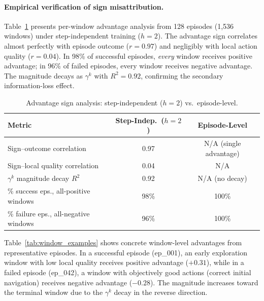 \documentclass[10pt]{article}
\begin{document}
\paragraph{Empirical verification of sign misattribution.}
Table~\ref{tab:sign} presents per-window advantage analysis from 128 episodes (1,536 windows) under step-independent training ($h{=}2$). The advantage sign correlates almost perfectly with episode outcome ($r = 0.97$) and negligibly with local action quality ($r = 0.04$). In 98\% of successful episodes, \emph{every} window receives positive advantage; in 96\% of failed episodes, every window receives negative advantage. The magnitude decays as $\gamma^k$ with $R^2 = 0.92$, confirming the secondary information-loss effect.

\begin{table}[h]
\centering
\caption{Advantage sign analysis: step-independent ($h{=}2$) vs.\ episode-level.}
\label{tab:sign}
\begin{tabular}{lcc}
\toprule
Metric & Step-Indep.\ ($h{=}2$) & Episode-Level \\
\midrule
Sign--outcome correlation & 0.97 & N/A (single advantage) \\
Sign--local quality correlation & 0.04 & N/A \\
$\gamma^k$ magnitude decay $R^2$ & 0.92 & N/A (no decay) \\
\% success eps., all-positive windows & 98\% & 100\% \\
\% failure eps., all-negative windows & 96\% & 100\% \\
\bottomrule
\end{tabular}
\end{table}

Table~\ref{tab:window_examples} shows concrete window-level advantages from representative episodes. In a successful episode (ep\_001), an early exploration window with low local quality receives positive advantage ($+0.31$), while in a failed episode (ep\_042), a window with objectively good actions (correct initial navigation) receives negative advantage ($-0.28$). The magnitude increases toward the terminal window due to the $\gamma^k$ decay in the reverse direction.
\end{document}
